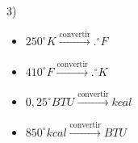 \documentclass[a4paper,10pt]{article}
\begin{document}
\vspace{0.5cm}

3)
\begin{itemize}
    \item $250^\circ K \xrightarrow{\text{convertir}}  .^\circ F $
    \item $410^\circ F \xrightarrow{\text{convertir}}  .^\circ K $
    \item $0,25^\circ BTU \xrightarrow{\text{convertir}} kcal $
    \item $850^\circ kcal \xrightarrow{\text{convertir}}  BTU $
\end{itemize}
\end{document}
